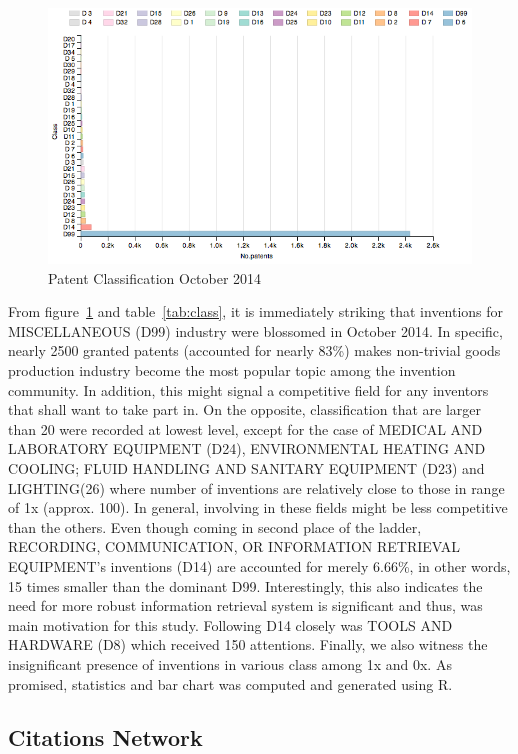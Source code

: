 \documentclass{article}
\begin{document}
\begin{figure}[H]
\centering
\includegraphics[width=\textwidth]{rplot-classification.png}
\caption{ Patent Classification October 2014 }\label{fig:rplot}
\end{figure}

From figure~\ref{fig:rplot} and table~\ref{tab:class}, it is immediately striking that inventions for MISCELLANEOUS (D99) industry were blossomed in October 2014. In specific, nearly 2500 granted patents (accounted for nearly 83\%) makes non-trivial goods production industry become the most popular topic among the invention community. In addition, this might signal a competitive field for any inventors that shall want to take part in. On the opposite, classification that are larger than 20 were recorded at lowest level, except for the case of  MEDICAL AND LABORATORY EQUIPMENT (D24), ENVIRONMENTAL HEATING AND COOLING; FLUID HANDLING AND SANITARY EQUIPMENT (D23) and LIGHTING(26) where number of inventions are relatively close to those in range of 1x (approx. 100). In general, involving in these fields might be less competitive than the others. Even though coming in second place of the ladder, RECORDING, COMMUNICATION, OR INFORMATION RETRIEVAL EQUIPMENT's inventions (D14) are accounted for merely 6.66\%, in other words, 15 times smaller than the dominant D99. Interestingly, this also indicates the need for more robust information retrieval system is significant and thus, was main motivation for this study. Following D14 closely was TOOLS AND HARDWARE (D8) which received 150 attentions. Finally, we  also witness the insignificant presence of inventions in various class among 1x and 0x. As promised, statistics and bar chart was computed and generated using R.

\subsection{Citations Network}
\end{document}
